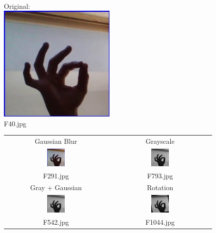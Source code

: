 \documentclass[10pt,twocolumn,letterpaper]{article}
\begin{document}
\\\begin{center}
    Original: \\\includegraphics[width=0.43\textwidth]{../asl_alphabet_modified/F/F40.jpg}\\F40.jpg
    \vspace{3mm}
    \\\begin{tabular}{|c|c|}
        \hline
        Gaussian Blur & Grayscale \\
        \includegraphics[width=0.18\textwidth]{../asl_alphabet_modified/F/F291.jpg}
        & \includegraphics[width=0.18\textwidth]{../asl_alphabet_modified/F/F793.jpg} \\
        F291.jpg & F793.jpg \\
        \hline
        Gray + Gaussian & Rotation \\
        \includegraphics[width=0.18\textwidth]{../asl_alphabet_modified/F/F542.jpg}
        & \includegraphics[width=0.18\textwidth]{../asl_alphabet_modified/F/F1044.jpg} \\
        F542.jpg & F1044.jpg \\
        \hline
    \end{tabular}
\end{center}
\end{document}

